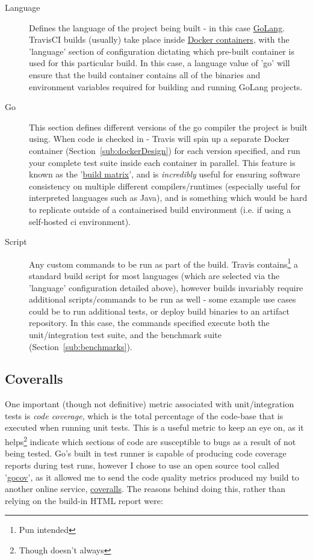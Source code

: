 \begin{description}
  \item[Language] Defines the language of the project being built - in this case
  \href{https://golang.org/}{GoLang}. TravisCI builds (usually) take place
  inside \href{https://www.docker.com/what-docker}{Docker containers}, with the
  'language' section of configuration dictating which pre-built container is
  used for this particular build. In this case, a language value of 'go' will
  ensure that the build container contains all of the binaries and environment
  variables required for building and running GoLang projects.
  \item[Go] This section defines different versions of the go compiler the
  project is built using. When code is checked in - Travis will spin up a
  separate Docker container (Section~\ref{sub:dockerDesign}) for each version
  specified, and run your complete test suite inside each container in parallel.
  This feature is known as the
  '\href{https://docs.travis-ci.com/user/customizing-the-build/#Build-Matrix}{build
  matrix}', and is \emph{incredibly} useful for ensuring software consistency on
  multiple different compilers/runtimes (especially useful for interpreted
  languages such as Java), and is something which would be hard to replicate
  outside of a containerised build environment (i.e. if using a self-hosted
  \gls{ci} environment).
  \item[Script] Any custom commands to be run as part of the build. Travis
  contains\footnote{Pun intended} a standard build script for most languages
  (which are selected via the 'language' configuration detailed above), however
  builds invariably require additional scripts/commands to be run as well - some
  example use cases could be to run additional tests, or deploy build binaries
  to an artifact repository. In this case, the commands specified execute both
  the unit/integration test suite, and the benchmark suite
  (Section~\ref{sub:benchmarks}).
\end{description}

\subsection{Coveralls}
\label{sub:Coveralls}


One important (though not definitive) metric associated with unit/integration
tests is \emph{code coverage}, which is the total percentage of the code-base
that is executed when running unit tests. This is a useful metric to keep an eye
on, as it helps\footnote{Though doesn't always} indicate which sections of code
are susceptible to bugs as a result of not being tested. Go's built in test
runner is capable of producing code coverage reports during test runs, however I
chose to use an open source tool called
'\href{https://github.com/axw/gocov}{gocov}', as it allowed me to send the code
quality metrics produced my build to another online service,
\href{https://coveralls.io/}{coveralls}. The reasons behind doing this, rather
than relying on the build-in HTML report were:


